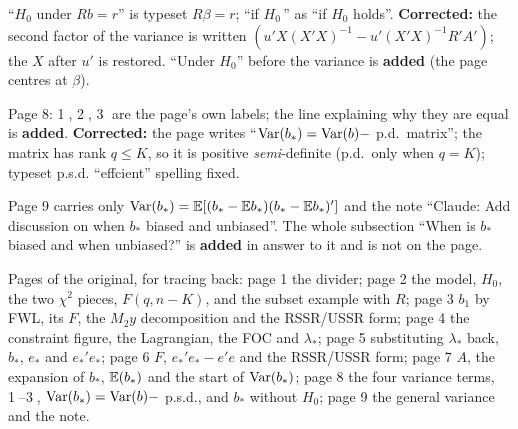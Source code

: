 \documentclass[11pt]{article}
\begin{document}
\begin{transcriptnotes}
        ``$H_{0}$ under $Rb = r$'' is typeset $R\beta = r$; ``if $H_{0}$\,\checkmark''
        as ``if $H_{0}$ holds''. \textbf{Corrected:} the second factor of the variance
        is written $(u'X(X'X)^{-1} - u'(X'X)^{-1}R'A')$; the $X$ after $u'$ is
        restored. ``Under $H_{0}$'' before the variance is \textbf{added} (the page
        centres at $\beta$).
  \item Page 8: \textcircled{\scriptsize 1}, \textcircled{\scriptsize 2},
        \textcircled{\scriptsize 3} are the page's own labels; the line explaining
        why they are equal is \textbf{added}. \textbf{Corrected:} the page writes
        ``$\operatorname{Var}(b_{*}) = \operatorname{Var}(b) - $ p.d.\ matrix''; the matrix has rank $q \le K$, so it
        is positive \emph{semi}-definite (p.d.\ only when $q = K$); typeset p.s.d.
        ``effcient'' spelling fixed.
  \item Page 9 carries only $\operatorname{Var}(b_{*}) = \mathbb{E}[(b_{*} - \mathbb{E} b_{*})(b_{*} - \mathbb{E} b_{*})']$ and
        the note ``Claude: Add discussion on when $b_{*}$ biased and unbiased''. The
        whole subsection ``When is $b_{*}$ biased and when unbiased?'' is
        \textbf{added} in answer to it and is not on the page.
  \item Pages of the original, for tracing back: page 1 the divider; page 2 the
        model, $H_{0}$, the two $\chi^{2}$ pieces, $F(q, n-K)$, and the subset example
        with $R$; page 3 $b_{1}$ by FWL, its $F$, the $M_{2}y$ decomposition and the
        RSSR/USSR form; page 4 the constraint figure, the Lagrangian, the FOC and
        $\lambda_{*}$; page 5 substituting $\lambda_{*}$ back, $b_{*}$, $e_{*}$ and
        $e_{*}'e_{*}$; page 6 $F$, $e_{*}'e_{*} - e'e$ and the RSSR/USSR form;
        page 7 $A$, the expansion of $b_{*}$, $\mathbb{E}(b_{*})$ and the start of
        $\operatorname{Var}(b_{*})$; page 8 the four variance terms, \textcircled{\scriptsize 1}--\textcircled{\scriptsize 3},
        $\operatorname{Var}(b_{*}) = \operatorname{Var}(b) - $ p.s.d., and $b_{*}$ without $H_{0}$; page 9 the
        general variance and the note.
\end{transcriptnotes}
\end{document}

